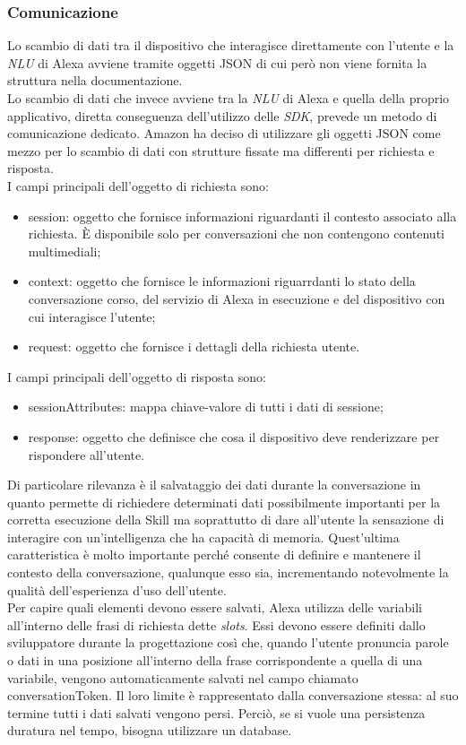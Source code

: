 		\subsubsection{Comunicazione}
		Lo scambio di dati tra il dispositivo che interagisce direttamente con l'utente e la \textit{NLU} di Alexa avviene tramite oggetti JSON di cui però non viene fornita la struttura nella documentazione. \\
		Lo scambio di dati che invece avviene tra la \textit{NLU} di Alexa e quella della proprio applicativo, diretta conseguenza dell'utilizzo delle \textit{SDK}, prevede un metodo di comunicazione dedicato. Amazon ha deciso di utilizzare gli oggetti JSON come mezzo per lo scambio di dati con strutture fissate ma differenti per richiesta e risposta. \\
		I campi principali dell'oggetto di richiesta sono:
		\begin{itemize}
			\item session: oggetto che fornisce informazioni riguardanti il contesto associato alla richiesta. È disponibile solo per conversazioni che non contengono contenuti multimediali;
			\item context: oggetto che fornisce le informazioni riguarrdanti lo stato della conversazione corso, del servizio di Alexa in esecuzione e del dispositivo con cui interagisce l'utente;
			\item request: oggetto che fornisce i dettagli della richiesta utente.
		\end{itemize}
		I campi principali dell'oggetto di risposta sono:
		\begin{itemize}
			\item sessionAttributes: mappa chiave-valore di tutti i dati di sessione;
			\item response: oggetto che definisce che cosa il dispositivo deve renderizzare per rispondere all'utente.
		\end{itemize}
		Di particolare rilevanza è il salvataggio dei dati durante la conversazione in quanto permette di richiedere determinati dati possibilmente importanti per la corretta esecuzione della Skill ma soprattutto di dare all'utente la sensazione di interagire con un'intelligenza che ha capacità di memoria. Quest'ultima caratteristica è molto importante perché consente di definire e mantenere il contesto della conversazione, qualunque esso sia, incrementando notevolmente la qualità dell'esperienza d'uso dell'utente. \\
		Per capire quali elementi devono essere salvati, Alexa utilizza delle variabili all'interno delle frasi di richiesta dette \textit{slots}. Essi devono essere definiti dallo sviluppatore durante la progettazione così che, quando l'utente pronuncia parole o dati in una posizione all'interno della frase corrispondente a quella di una variabile, vengono automaticamente salvati nel campo chiamato conversationToken. Il loro limite è rappresentato dalla conversazione stessa: al suo termine tutti i dati salvati vengono persi. Perciò, se si vuole una persistenza duratura nel tempo, bisogna utilizzare un database.
